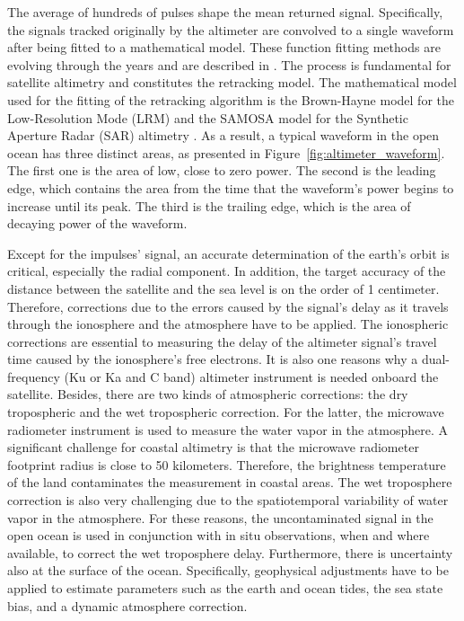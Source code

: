 The average of hundreds of pulses shape the mean returned signal. Specifically, the signals tracked originally by the altimeter are convolved to a single waveform after being fitted to a mathematical model. These function fitting methods are evolving through the years and are described in \cite{Gommenginger2011}. The process is fundamental for satellite altimetry and constitutes the retracking model. The mathematical model used for the fitting of the retracking algorithm is the Brown-Hayne model \cite{Brown1977TheApplications, Hayne1980RadarScattering} for the Low-Resolution Mode (LRM) and the SAMOSA model for the Synthetic Aperture Radar (SAR) altimetry \citep{Ray2015SARModel}. As a result, a typical waveform in the open ocean has three distinct areas, as presented in Figure~\ref{fig:altimeter_waveform}. The first one is the area of low, close to zero power. The second is the leading edge, which contains the area from the time that the waveform's power begins to increase until its peak. The third is the trailing edge, which is the area of decaying power of the waveform.

Except for the impulses' signal, an accurate determination of the earth's orbit is critical, especially the radial component. In addition, the target accuracy of the distance between the satellite and the sea level is on the order of 1 centimeter. Therefore, corrections due to the errors caused by the signal's delay as it travels through the ionosphere and the atmosphere have to be applied. The ionospheric corrections are essential to measuring the delay of the altimeter signal's travel time caused by the ionosphere's free electrons. It is also one reasons why a dual-frequency (Ku or Ka and C band) altimeter instrument is needed onboard the satellite. Besides, there are two kinds of atmospheric corrections: the dry tropospheric and the wet tropospheric correction. For the latter, the microwave radiometer instrument is used to measure the water vapor in the atmosphere. A significant challenge for coastal altimetry is that the microwave radiometer footprint radius is close to 50 kilometers. Therefore, the brightness temperature of the land contaminates the measurement in coastal areas. The wet troposphere correction is also very challenging due to the spatiotemporal variability of water vapor in the atmosphere. For these reasons, the uncontaminated signal in the open ocean is used in conjunction with in situ observations, when and where available, to correct the wet troposphere delay. Furthermore, there is uncertainty also at the surface of the ocean. Specifically, geophysical adjustments have to be applied to estimate parameters such as the earth and ocean tides, the sea state bias, and a dynamic atmosphere correction.

